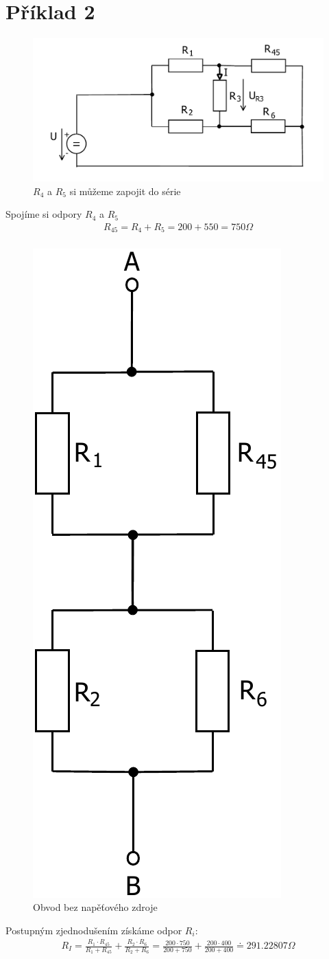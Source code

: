 \section{Příklad 2}
\begin{figure}[H]
		\center\includegraphics[width=0.6\linewidth]{obr/2_1.pdf}
		\caption{$R_4$ a $R_5$ si můžeme zapojit do série}
	\end{figure}
Spojíme si odpory ${R_4}$ a ${R_5}$
\begin{gather*}
R_{45} = R_4 + R_5 = 200 + 550 = 750\Omega \\
\end{gather*}


\begin{figure}[H]
		\center\includegraphics[width=0.25\linewidth]{obr/2_2.pdf}
		\caption{Obvod bez napěťového zdroje}
	\end{figure}
Postupným zjednodušením získáme odpor ${R_i}$:	
\begin{gather*}
R_I = \frac{R_{1}\cdot R_{45}}{R_{1} + R_{45}}+\frac{R_{2}\cdot R_{6}}{R_{2} + R_{6}} = \frac{200\cdot 750}{200 + 750}+\frac{200\cdot 400}{200 + 400}\doteq 291.22807 \Omega\\
\end{gather*}

